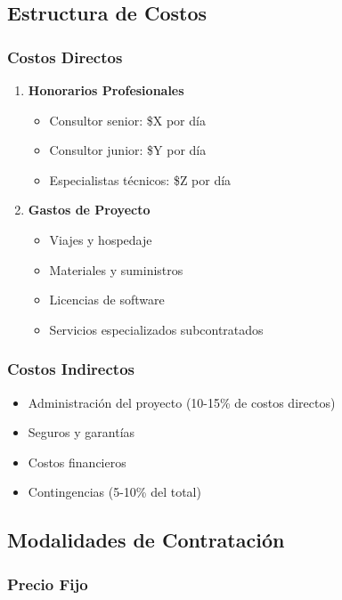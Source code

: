 \documentclass[12pt,letterpaper,oneside]{book}
\begin{document}
\subsection{Estructura de Costos}

\subsubsection{Costos Directos}

\begin{enumerate}
\item \textbf{Honorarios Profesionales}
   \begin{itemize}
   \item Consultor senior: \$X por día
   \item Consultor junior: \$Y por día
   \item Especialistas técnicos: \$Z por día
   \end{itemize}

\item \textbf{Gastos de Proyecto}
   \begin{itemize}
   \item Viajes y hospedaje
   \item Materiales y suministros
   \item Licencias de software
   \item Servicios especializados subcontratados
   \end{itemize}
\end{enumerate}

\subsubsection{Costos Indirectos}

\begin{itemize}
\item Administración del proyecto (10-15\% de costos directos)
\item Seguros y garantías
\item Costos financieros
\item Contingencias (5-10\% del total)
\end{itemize}

\subsection{Modalidades de Contratación}

\subsubsection{Precio Fijo}
\end{document}
